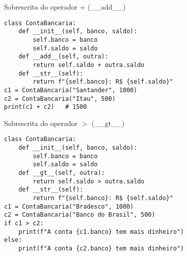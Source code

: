 \begin{frame}[fragile]{Sobrescrita do operador + (\_\_add\_\_)}

\begin{verbatim}
class ContaBancaria:
    def __init__(self, banco, saldo):
        self.banco = banco
        self.saldo = saldo
    def __add__(self, outra):
        return self.saldo + outra.saldo
    def __str__(self):
        return f"{self.banco}: R$ {self.saldo}"
c1 = ContaBancaria("Santander", 1000)
c2 = ContaBancaria("Itau", 500)
print(c1 + c2)   # 1500
\end{verbatim}


\end{frame}
\begin{frame}[fragile]{Sobrescrita do operador  $>$ (\_\_gt\_\_)}


\begin{verbatim}
class ContaBancaria:
    def __init__(self, banco, saldo):
        self.banco = banco
        self.saldo = saldo
    def __gt__(self, outra):
        return self.saldo > outra.saldo
    def __str__(self):
        return f"{self.banco}: R$ {self.saldo}"
c1 = ContaBancaria("Bradesco", 1000)
c2 = ContaBancaria("Banco do Brasil", 500)
if c1 > c2:
    print(f"A conta {c1.banco} tem mais dinheiro")
else:
    print(f"A conta {c2.banco} tem mais dinheiro")

\end{verbatim}

\end{frame}

